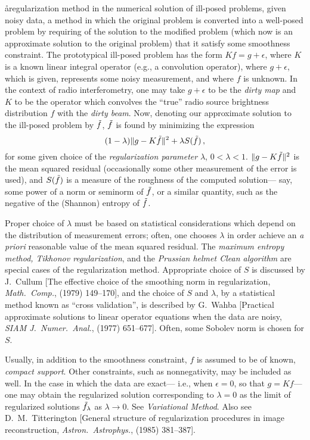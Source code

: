 \aa{regularization method}
in the numerical solution of ill-posed problems, given noisy data,
a method in which the original problem is converted into
a well-posed problem by requiring of the solution
to the modified problem (which now is an approximate solution to
the original problem)
that it satisfy some smoothness constraint.
The prototypical ill-posed problem has the form
$Kf=g+\epsilon$, where $K$ is a known linear integral operator (e.g., a
convolution operator), where $g+\epsilon$,
which is given, represents some noisy measurement,
and where $f$ is unknown.
In the context of radio interferometry, one may take $g+\epsilon$
to be the {\it dirty map} and $K$ to be the operator which
convolves the ``true'' radio source brightness distribution $f$
with the {\it dirty beam}.
Now, denoting our approximate solution to the ill-posed
problem by $\tilde f$, $\tilde f$ is found by minimizing the expression
$$(1-\lambda)\|g-K\tilde f\|^2+\lambda S(\tilde f)\,,$$
for some given choice of the {\it regularization parameter}
$\lambda$, $0<\lambda<1$.
$\|g-K\tilde f\|^2$ is the mean squared residual (occasionally
some other measurement of the error is used), and $S(\tilde f)$ is
a measure of the roughness of the computed solution---%
say, some power of a norm or seminorm of $\tilde f$, or a similar quantity,
such as the negative of the (Shannon) entropy of $\tilde f$.
\par
Proper choice of $\lambda$ must be based on statistical
considerations which depend on the distribution of measurement
errors; often, one chooses $\lambda$ in order
achieve an {\it a priori} reasonable value of the mean squared residual.
The {\it maximum entropy method, Tikhonov regularization}, and
the {\it Prussian helmet Clean algorithm}
are special cases of the regularization method.
Appropriate choice of $S$ is discussed by J.~Cullum
[The effective choice of the smoothing norm in
regularization, {\it Math.\ Comp.},  (1979) 149--170],
and the choice of $S$ and $\lambda$, by a statistical method known
as ``cross validation'', is described by G.~Wahba
[Practical approximate solutions to linear operator
equations when the data are noisy, {\it SIAM J.\ Numer.\ Anal.},
 (1977) 651--677].
Often, some Sobolev norm is chosen for $S$.
\par
Usually, in addition to the smoothness constraint, $f$ is assumed
to be of known, {\it compact support}.
Other constraints, such as nonnegativity, may be included as well.
In the case in which the data are exact---%
i.e., when $\epsilon=0$, so that $g=Kf$---%
one may obtain the regularized solution corresponding to $\lambda=0$
as the limit of regularized solutions $\tilde f_\lambda$ as $\lambda\to0$.
See {\it Variational Method}.
Also see D.~M.~Titterington [General structure of regularization
procedures in image reconstruction, {\it Astron.\ Astrophys.},
 (1985) 381--387].

